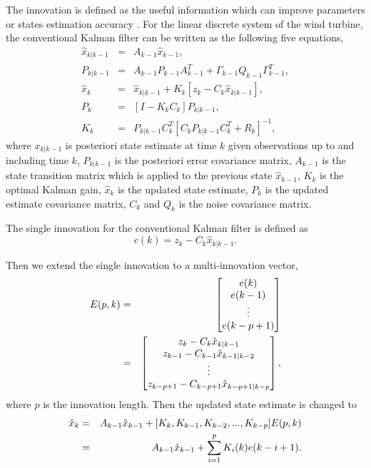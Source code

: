 \documentclass{article}
\begin{document}
The innovation is defined as the useful information which can improve parameters
or states estimation accuracy \cite{ref:17}. For the linear discrete system of the
wind turbine,
the conventional Kalman filter can be written as the
following five equations,
\begin{eqnarray}
  \hat{x}_{k|k-1} &=& A_{k-1}\hat{x}_{k-1}, \\
  P_{k|k-1} &=& A_{k-1}P_{k-1}A^T_{k-1} + \Gamma_{k-1}Q_{k-1}\Gamma^T_{k-1}, \\
  \hat{x}_k &=& \hat{x}_{k|k-1} + K_k[z_k - C_k\hat{x}_{k|k-1}], \\
  P_k &=& [I - K_k C_k]P_{k|k-1}, \\
  K_k &=& P_{k|k-1}C^T_k[C_k P_{k|k-1}C^T_k + R_k]^{-1},
\end{eqnarray}
where ${x}_{k|k-1}$ is  posteriori state estimate at time $k$ given
observations up to and including time $k$, $P_{k|k-1}$ is the
posteriori error covariance matrix, $A_{k-1}$ is the state transition matrix
which is applied to the previous state $\hat{x}_{k-1}$, $K_k$ is the
optimal Kalman gain, $\hat{x}_k$ is the updated state estimate, $P_k$ is
the updated estimate covariance matrix, $C_k$ and $Q_k$ is the noise covariance matrix.

The single innovation for the conventional Kalman filter is defined as
\begin{equation}
  c(k) = z_k - C_k\hat{x}_{k|k-1}.
\end{equation}

Then we extend the single innovation to a multi-innovation vector,
\begin{eqnarray}
E(p, k) &=& \begin{bmatrix}
e(k) \\
e(k-1) \\
\vdots \\
e(k-p+1)
\end{bmatrix} \notag\\
&=&
\begin{bmatrix}
z_k - C_k\hat{x}_{k|k-1} \\
z_{k-1} - C_{k-1}\hat{x}_{k-1|k-2} \\
\vdots \\
z_{k-p+1} - C_{k-p+1}\hat{x}_{k-p+1|k-p}
\end{bmatrix},
\end{eqnarray}
where $p$ is the innovation length. Then the updated state estimate is changed to
\begin{eqnarray}
  \hat{x}_k &=& A_{k-1}\hat{x}_{k-1} + [K_{k}, K_{k-1}, K_{k-2}, ... , K_{k-p}] E(p, k) \notag\\
  &=& A_{k-1}\hat{x}_{k-1} + \sum^p_{i=1}K_i(k)e(k-i+1).
\end{eqnarray}
\end{document}
